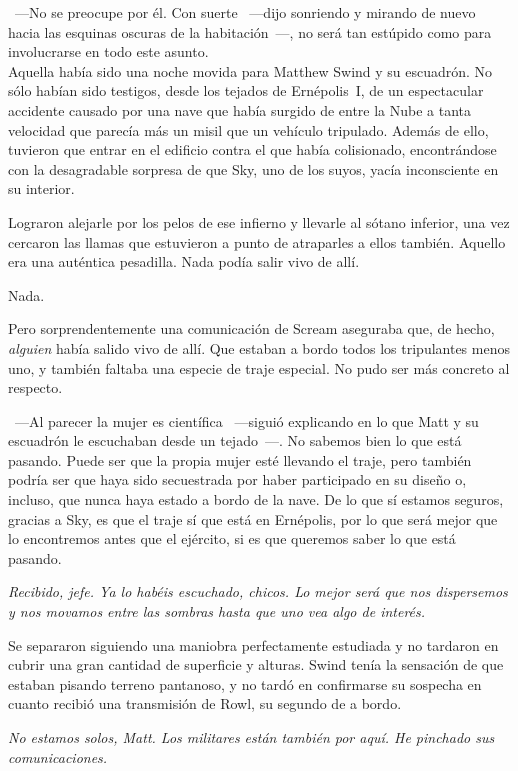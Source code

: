 ~---No se preocupe por él. Con suerte ~---dijo sonriendo y mirando de nuevo hacia las esquinas oscuras de la habitación~---, no será tan estúpido como para involucrarse en todo este asunto.\\

\noindent{}Aquella había sido una noche movida para Matthew Swind y su escuadrón. No sólo habían sido testigos, desde los tejados de Ernépolis~I, de un espectacular accidente causado por una nave que había surgido de entre la Nube a tanta velocidad que parecía más un misil que un vehículo tripulado. Además de ello, tuvieron que entrar en el edificio contra el que había colisionado, encontrándose con la desagradable sorpresa de que Sky, uno de los suyos, yacía inconsciente en su interior.

Lograron alejarle por los pelos de ese infierno y llevarle al sótano inferior, una vez cercaron las llamas que estuvieron a punto de atraparles a ellos también. Aquello era una auténtica pesadilla. Nada podía salir vivo de allí.

Nada.

Pero sorprendentemente una comunicación de Scream aseguraba que, de hecho, \emph{alguien} había salido vivo de allí. Que estaban a bordo todos los tripulantes menos uno, y también faltaba una especie de traje especial. No pudo ser más concreto al respecto.

~---Al parecer la mujer es científica ~---siguió explicando en lo que Matt y su escuadrón le escuchaban desde un tejado~---. No sabemos bien lo que está pasando. Puede ser que la propia mujer esté llevando el traje, pero también podría ser que haya sido secuestrada por haber participado en su diseño o, incluso, que nunca haya estado a bordo de la nave. De lo que sí estamos seguros, gracias a Sky, es que el traje sí que está en Ernépolis, por lo que será mejor que lo encontremos antes que el ejército, si es que queremos saber lo que está pasando.

\emph{Recibido, jefe. Ya lo habéis escuchado, chicos. Lo mejor será que nos dispersemos y nos movamos entre las sombras hasta que uno vea algo de interés.}

Se separaron siguiendo una maniobra perfectamente estudiada y no tardaron en cubrir una gran cantidad de superficie y alturas. Swind tenía la sensación de que estaban pisando terreno pantanoso, y no tardó en confirmarse su sospecha en cuanto recibió una transmisión de Rowl, su segundo de a bordo.

\emph{No estamos solos, Matt. Los militares están también por aquí. He pinchado sus comunicaciones.}

